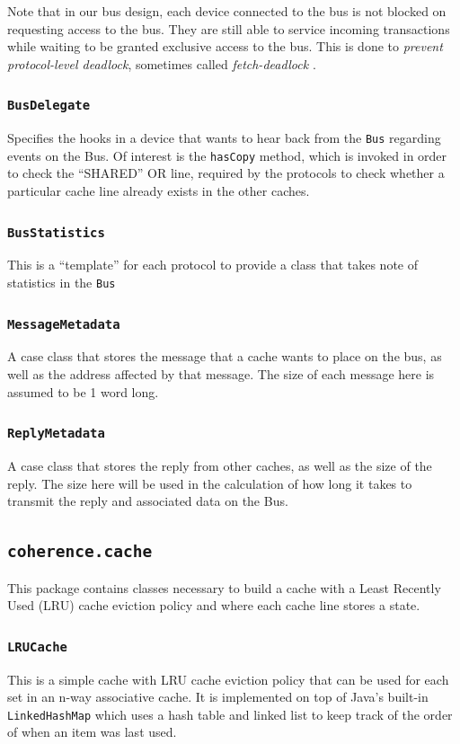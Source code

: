 \documentclass[nonacm,acmsmall,screen,11pt]{acmart}
\begin{document}
Note that in our bus design, each device connected to the bus is not blocked on requesting access to the bus.
They are still able to service incoming transactions while waiting to be granted exclusive access to the bus.
This is done to \emph{prevent protocol-level deadlock}, sometimes called \emph{fetch-deadlock} \cite{Culler:1998:PCA:2821564}.

\subsubsection{\texttt{BusDelegate}}
Specifies the hooks in a device that wants to hear back from the \texttt{Bus} regarding events on the Bus.
Of interest is the \texttt{hasCopy} method, which is invoked in order to check the ``SHARED'' OR line, required by the protocols to check whether a particular cache line already exists in the other caches.

\subsubsection{\texttt{BusStatistics}}
This is a ``template'' for each protocol to provide a class that takes note of statistics in the \texttt{Bus}

\subsubsection{\texttt{MessageMetadata}}
A case class that stores the message that a cache wants to place on the bus, as well as the address affected by that message.
The size of each message here is assumed to be 1 word long.

\subsubsection{\texttt{ReplyMetadata}}
A case class that stores the reply from other caches, as well as the size of the reply.
The size here will be used in the calculation of how long it takes to transmit the reply and associated data on the Bus.

\subsection{\texttt{coherence.cache}}
This package contains classes necessary to build a cache with a Least Recently Used (LRU) cache eviction policy and where each cache line stores a state.

\subsubsection{\texttt{LRUCache}}
This is a simple cache with LRU cache eviction policy that can be used for each set in an n-way associative cache.
It is implemented on top of Java's built-in \texttt{LinkedHashMap} which uses a hash table and linked list to keep track of the order of when an item was last used.
\end{document}
